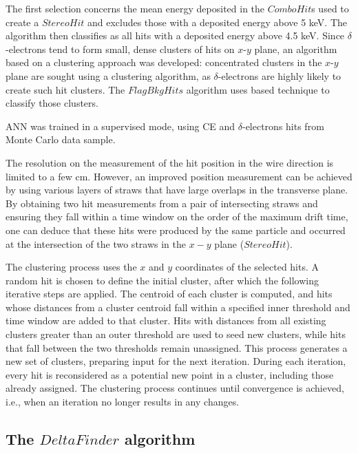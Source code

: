 The first selection concerns the 
mean energy deposited in  
the $ComboHit$s used to create a 
$StereoHit$ and excludes 
those with a deposited energy above 5 keV.
%
The algorithm then classifies as 
 all hits with a deposited 
energy above 4.5 keV.
Since $\delta$-electrons tend to form small, dense 
clusters of hits on $x$-$y$ plane, an algorithm based on a clustering 
approach was developed: concentrated clusters in the 
$x$-$y$ plane are sought using a clustering algorithm, 
as $\delta$-electrons are highly likely to create 
such hit clusters.
The $FlagBkgHits$ algorithm uses  
based
technique to classify those clusters.

 ANN was trained in a supervised mode, 
using CE and $\delta$-electrons hits from 
Monte Carlo data sample.

The resolution on the measurement of the 
hit position in the wire direction is limited to a few cm. 
However, an improved position measurement can be 
achieved by using various layers of straws that have large overlaps in the transverse plane. 
By obtaining two hit measurements from a pair of 
intersecting straws and ensuring they fall within 
a time window on the order of the maximum drift time, 
one can deduce that these hits were produced by the 
same particle and occurred at the intersection of the 
two straws in the $x-y$ plane ($StereoHit$).

The clustering process uses the $x$ and $y$ coordinates 
of the selected hits. A random hit is chosen to define 
the initial cluster, after which the following iterative 
steps are applied. The centroid of each cluster is 
computed, and hits whose distances from a cluster 
centroid fall within a specified inner threshold 
and time window are added to that cluster. Hits 
with distances from all existing clusters greater 
than an outer threshold are used to seed new 
clusters, while hits that fall between the two 
thresholds remain unassigned. This process 
generates a new set of clusters, preparing input 
for the next iteration. During each 
iteration, every hit is reconsidered as a 
potential new point in a cluster, including 
those already assigned. The clustering process 
continues until convergence is achieved, i.e., 
when an iteration no longer results in any changes.


\subsection{The $DeltaFinder$ algorithm}\label{deltafinder}

